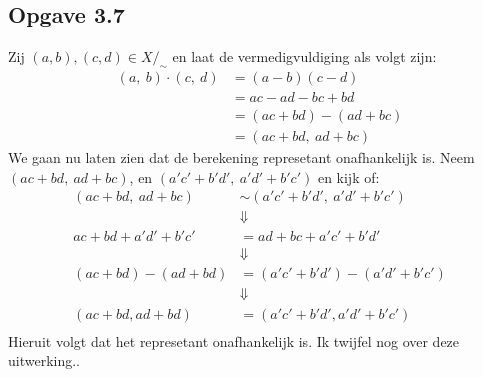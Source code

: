\documentclass{article}
\newcommand{\q}{/_\sim}
\begin{document}
\subsection*{Opgave 3.7}
Zij $(a, b), (c, d) \in X\q$ en laat de vermedigvuldiging als volgt zijn:
\begin{align*}
	(a, \ b)\cdot(c, \ d) & = (a-b)(c-d)            \\
	                      & = ac - ad - bc + bd     \\
	                      & = (ac + bd) - (ad + bc) \\
	                      & = (ac + bd, \ ad + bc)
\end{align*}
We gaan nu laten zien dat de berekening represetant onafhankelijk is.
Neem $(ac + bd, \ ad + bc)$, en $(a'c' + b'd', \ a'd'+b'c')$ en kijk of:
\begin{align*}
	(ac + bd, \ ad + bc)  & \sim (a'c' + b'd', \ a'd' + b'c') \\
	                      & \Downarrow                        \\
	ac + bd + a'd' + b'c' & = ad + bc + a'c' + b'd'           \\
	                      & \Downarrow                        \\
	(ac + bd) - (ad + bd) & = (a'c' + b'd') - (a'd' + b'c')   \\
	                      & \Downarrow                        \\
	(ac + bd, ad + bd)    & = (a'c' + b'd', a'd' + b'c')      \\
\end{align*}
Hieruit volgt dat het represetant onafhankelijk is. Ik twijfel nog over deze uitwerking..
\end{document}
